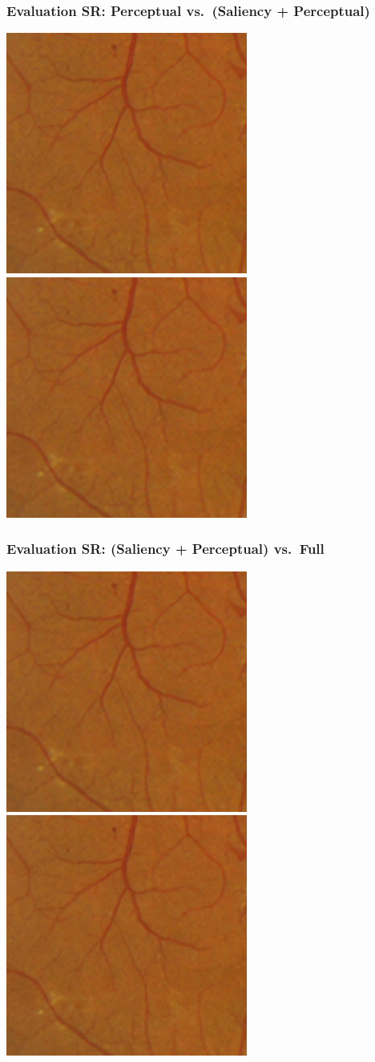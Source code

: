 \documentclass{beamer}
\begin{document}
\begin{frame} \frametitle{Evaluation SR: Perceptual vs.\ (Saliency + Perceptual) }
\includegraphics[width=0.48\linewidth]{patch_sr1_perc}\quad
\includegraphics[width=0.48\linewidth]{patch_sr1_sal_perc}
\end{frame}

\begin{frame} \frametitle{Evaluation SR: (Saliency + Perceptual) vs.\ Full }
\includegraphics[width=0.48\linewidth]{patch_sr1_sal_perc}\quad
\includegraphics[width=0.48\linewidth]{patch_sr1_gan}
\end{frame}
\end{document}
